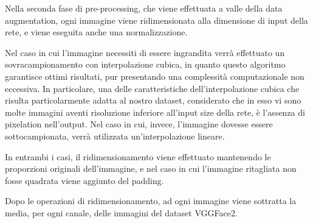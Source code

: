 Nella seconda fase di pre-processing, che viene effettuata a valle della data augmentation, ogni immagine viene ridimensionata alla dimensione di input della rete, e viene eseguita anche una normalizzazione. 

Nel caso in cui l'immagine necessiti di essere ingrandita verrà effettuato un sovracampionamento con interpolazione cubica, in quanto questo algoritmo garantisce ottimi risultati, pur presentando una complessità computazionale non eccessiva. In particolare, una delle caratteristiche dell'interpolazione cubica che risulta particolarmente adatta al nostro dataset, considerato che in esso vi sono molte immagini aventi risoluzione inferiore all'input size della rete, è l'assenza di pixelation nell'output.
Nel caso in cui, invece, l'immagine dovesse essere sottocampionata, verrà utilizzata un'interpolazione lineare. 

In entrambi i casi, il ridimensionamento viene effettuato mantenendo le proporzioni originali dell'immagine, e nel caso in cui l'immagine ritagliata non fosse quadrata viene aggiunto del padding. 

Dopo le operazioni di ridimensionamento, ad ogni immagine viene sottratta la media, per ogni canale, delle immagini del dataset VGGFace2.

